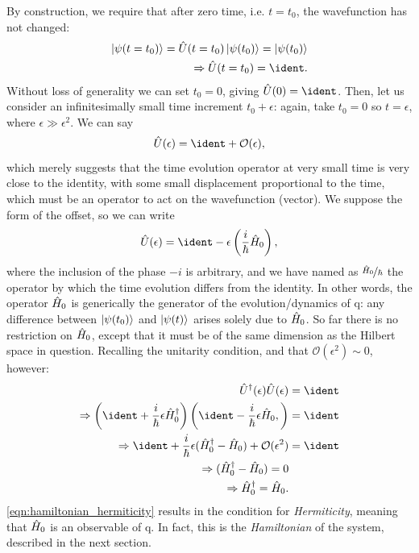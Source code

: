 By construction, we require that after zero time, i.e. $t = t_0$, the wavefunction has not changed:
\begin{equation}
    \begin{split}
        \ket{\psi(t = t_0)} = \hat{U}(t = t_0)\ket{\psi(t_0)} = \ket{\psi(t_0)}
        \\ \Rightarrow \hat{U}(t = t_0) = \ident.
    \end{split}
\end{equation}
Without loss of generality we can set $t_0 = 0$, giving $\hat{U}(0) = \ident$. 
Then, let us consider an infinitesimally small time increment $t_0 + \epsilon$:
    again, take $t_0 = 0$ so $t = \epsilon$,  where $\epsilon \gg \epsilon^2$. 
We can say
\begin{equation}
    \hat{U}(\epsilon) = \ident + \mathcal{O}(\epsilon),
\end{equation}
which merely suggests that the time evolution operator
    at very small time is very close to the identity, with some small displacement proportional to the time,
    which must be an operator to act on the wavefunction (vector).
We suppose the form of the offset, so we can write
\begin{equation}
    \hat{U}(\epsilon) = \ident - \epsilon \left(\frac{i}{\hbar} \ho \right),
\end{equation}
    where the inclusion of the phase $-i$ is arbitrary, 
    and we have named as $\nicefrac{\hat{H}_0}{\hbar}$ the operator by which the time evolution differs from the identity. 
In other words, the operator $\hat{H}_0$ is generically the generator of the evolution/dynamics of \gls{q}:
    any difference between $\ket{\psi(t_0)}$ and $\ket{\psi(t)}$ arises solely due to $\hat{H}_0$. 
So far there is no restriction on $\hat{H}_0$, 
    except that it must be of the same dimension as the Hilbert space in question. 
Recalling the unitarity condition, and that $\mathcal{O}(\epsilon^2) \sim 0$, however:
\begin{equation}
    \label{eqn:hamiltonian_hermiticity}
    \begin{split}
        \hat{U}^{\dag}(\epsilon) \hat{U}(\epsilon) &= \ident
        \\ 
        \Rightarrow 
        \left( \ident + \frac{i}{\hbar} \epsilon \ho^\dag \right) \left( \ident - \frac{i}{\hbar} \epsilon \ho, \right)  &= \ident
        \\
        \Rightarrow
        \ident +  \frac{i}{\hbar} \epsilon (\ho^{\dag} - \ho) + \mathcal{O}(\epsilon^2) &= \ident
        \\
        \Rightarrow
        (\ho^{\dag} - \ho) = 0 
        \\
        \Rightarrow
        \ho^{\dag} = \ho.
    \end{split}
\end{equation}
\cref{eqn:hamiltonian_hermiticity} results in the condition for \emph{Hermiticity}, 
    meaning that $\hat{H}_0$ is an observable of \gls{q}. 
In fact, this is the \emph{Hamiltonian} of the system, described in the next section. 

